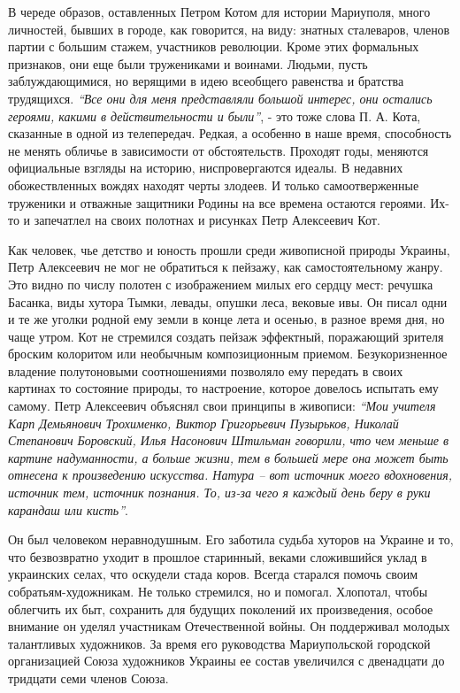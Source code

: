В череде образов, оставленных Петром Котом для истории Мариуполя, много
личностей, бывших в городе, как говорится, на виду: знатных сталеваров, членов
партии с большим стажем, участников революции. Кроме этих формальных
признаков, они еще были тружениками и воинами. Людьми, пусть заблуждающимися,
но верящими в идею всеобщего равенства и братства трудящихся. \emph{\enquote{Все они для
меня представляли большой интерес, они остались героями, какими в
действительности и были}}, - это тоже слова П. А. Кота, сказанные в одной из
телепередач. Редкая, а особенно в наше время, способность не менять обличье в
зависимости от обстоятельств. Проходят годы, меняются официальные взгляды на
историю, ниспровергаются идеалы. В недавних обожествленных вождях находят
черты злодеев. И только самоотверженные труженики и отважные защитники Родины
на все времена остаются героями. Их-то и запечатлел на своих полотнах и
рисунках Петр Алексеевич Кот.

Как человек, чье детство и юность прошли среди живописной природы Украины, Петр
Алексеевич не мог не обратиться к пейзажу, как самостоятельному жанру. Это
видно по числу полотен с изображением милых его сердцу мест: речушка Басанка,
виды хутора Тымки, левады, опушки леса, вековые ивы. Он писал одни и те же
уголки родной ему земли в конце лета и осенью, в разное время дня, но чаще
утром. Кот не стремился создать пейзаж эффектный, поражающий зрителя броским
колоритом или необычным композиционным приемом. Безукоризненное владение
полутоновыми соотношениями позволяло ему передать в своих картинах то состояние
природы, то настроение, которое довелось испытать ему самому. Петр Алексеевич
объяснял свои принципы в живописи: \emph{\enquote{Мои учителя Карп Демьянович Трохименко,
Виктор Григорьевич Пузырьков, Николай Степанович Боровский, Илья Насонович
Штильман говорили, что чем меньше в картине надуманности, а больше жизни, тем в
большей мере она может быть отнесена к произведению искусства. Натура – вот
источник моего вдохновения, источник тем, источник познания. То, из-за чего я
каждый день беру в руки карандаш или кисть}}.

Он был человеком неравнодушным. Его заботила судьба хуторов на Украине и то,
что безвозвратно уходит в прошлое старинный, веками сложившийся уклад в
украинских селах, что оскудели стада коров. Всегда старался помочь своим
собратьям-художникам. Не только стремился, но и помогал. Хлопотал, чтобы
облегчить их быт, сохранить для будущих поколений их произведения, особое
внимание он уделял участникам Отечественной войны. Он поддерживал молодых
талантливых художников. За время его руководства Мариупольской городской
организацией Союза художников Украины ее состав увеличился с двенадцати до
тридцати семи членов Союза.

